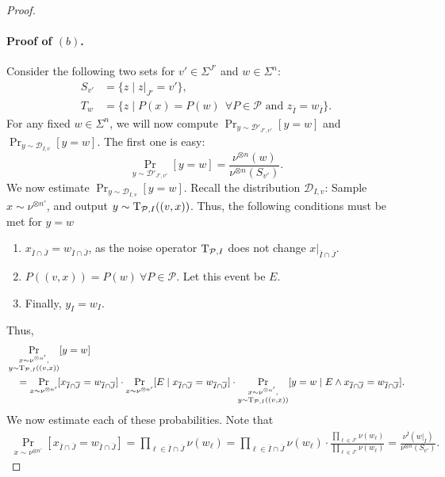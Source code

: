 \documentclass[11pt]{article}
\begin{document}
\begin{proof}
\paragraph{Proof of $(b)$.}
Consider the following two sets for $v'\in \Sigma^{J'}$ and $w\in \Sigma^n$:
\begin{align*}
    S_{v'} &= \{ z \mid z|_{J'} = v'\},\\
    T_w &= \{z\mid P(x) = P(w) ~~\forall P\in \mathcal{P} \mbox{ and } z_{\overline{I}} = w_{\overline{I}}\}.
\end{align*}
For any fixed $w\in \Sigma^n$, we will now compute $\Pr_{y\sim \mathcal{D}'_{J', v'}}[y=w]$ and $\Pr_{y\sim \mathcal{D}_{I,v}}[y=w]$. The first one is easy:
$$\Pr_{y\sim \mathcal{D'}_{J', v'}}[y=w] = \frac{\nu^{\otimes n}(w)}{\nu^{\otimes n}(S_{v'})}.$$
We now estimate $\Pr_{y\sim \mathcal{D}_{I,v}}[y=w]$. Recall the distribution $\mathcal{D}_{I,v}$: Sample $x\sim \nu^{\otimes n'}$, and output $y\sim {\rm T}_{\mathcal{P},I} ((v, x))$. Thus, the following conditions must be met for $y=w$
\begin{enumerate}
    \item $x_{\overline{I}\cap \overline{J}} = w_{\overline{I}\cap \overline{J}}$, as the noise operator ${\rm T}_{\mathcal{P},I}$ does not change $x|_{\overline{I}\cap \overline{J}}$. 
    \item $P((v,x)) = P(w) ~\forall P\in \mathcal{P}$. Let this event be $E$.
    \item Finally, $y_{I} = w_{I}$.
\end{enumerate}
Thus,
\begin{align*}
    &\Pr_{\substack{x\sim \nu^{\otimes n'},\\ y\sim {\rm T}_{\mathcal{P},I} ((v, x))}}[y=w] \\
    &\quad= \Pr_{x\sim \nu^{\otimes n'}}[x_{\overline{I}\cap \overline{J}} = w_{\overline{I}\cap \overline{J}}]\cdot \Pr_{x\sim \nu^{\otimes n'}}[ E \mid x_{\overline{I}\cap \overline{J}} = w_{\overline{I}\cap \overline{J}}] \cdot  \Pr_{\substack{x\sim \nu^{\otimes n'},\\ y\sim {\rm T}_{\mathcal{P},I} ((v, x))}}[y=w \mid E \wedge x_{\overline{I}\cap \overline{J}} = w_{\overline{I}\cap \overline{J}}].
\end{align*}
We now estimate each of these probabilities. Note that
\begin{align*}
    \Pr_{x\sim \nu^{\otimes n'}}[x_{\overline{I}\cap \overline{J}} = w_{\overline{I}\cap \overline{J}}] = \prod_{\ell\in \overline{I}\cap \overline{J} } \nu(w_\ell) = \prod_{\ell\in \overline{I}\cap \overline{J} } \nu(w_\ell)  \cdot \frac{\prod_{\ell\in J'} \nu(w_\ell) }{\prod_{\ell\in J'} \nu(w_\ell) } = \frac{\nu^{\bar{I}}(w|_{\overline{I}})}{\nu^{\otimes n}(S_{v'})}.

\end{align*}
\end{proof}
\end{document}
